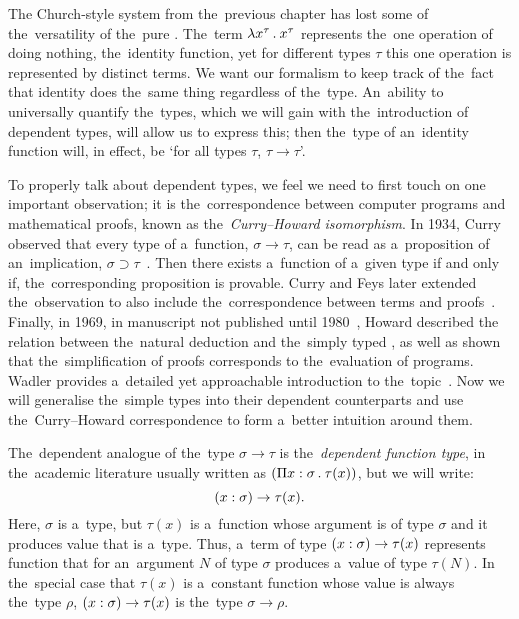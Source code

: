 
The Church-style system from the~previous chapter has lost some of
the~versatility of the~pure \lc. The~term $\lambda x^\tau \, . \: x^\tau$ represents
the~one operation of doing nothing, the~identity function, yet for different
types $\tau$ this one operation is represented by distinct terms. We want our
formalism to keep track of the~fact that identity does the~same thing regardless
of the~type. An~ability to universally quantify the~types, which we will gain
with the~introduction of dependent types, will allow us to express this; then
the~type of an~identity function will, in effect, be `for all types $\tau$,
$\tau \to \tau$'.

To properly talk about dependent types, we feel we need to first touch on one
important observation; it is the~correspondence between computer programs and
mathematical proofs, known as the~\emph{Curry–Howard isomorphism}. In 1934,
Curry observed that every type of a~function, $\sigma \to \tau$, can be read as
a~proposition of an~implication, $\sigma \supset \tau$~\cite{curry_1934}.
Then there exists a~function of a~given type if and only if, the~corresponding
proposition is provable. Curry and Feys later extended the~observation to also
include the~correspondence between terms and proofs~\cite{curry_1958}. Finally,
in 1969, in manuscript not published until 1980~\cite{howard_1980}, Howard
described the relation between the~natural deduction and the~simply typed \lc,
as well as shown that the~simplification of proofs corresponds to the~evaluation
of programs. Wadler provides a~detailed yet approachable introduction to
the~topic~\cite{wadler_2015}. Now we will generalise the~simple types into their
dependent counterparts and use the~Curry–Howard correspondence to form a~better
intuition around them.

The~dependent analogue of the~type $\sigma \to \tau$ is the~\emph{dependent
function type}, in the~academic literature usually written as ${(\Pi x \stackrel{}:
\sigma \, . \: \tau(x))}$, but we will write:
\[
  (x : \sigma) \to \tau(x).
\]
Here, $\sigma$ is a~type, but $\tau(x)$ is a~function whose argument is of type
$\sigma$ and it produces value that is a~type. Thus, a~term of type $(x : \sigma) \to \tau(x)$ represents function that for an~argument $N$ of type $\sigma$
produces a~value of type $\tau(N)$. In the~special case that $\tau(x)$ is
a~constant function whose value is always the~type $\rho$, $(x : \sigma) \to \tau(x)$ is the~type $\sigma \to \rho$.

